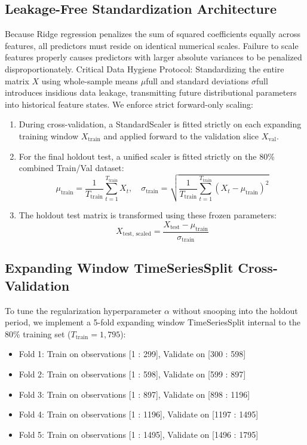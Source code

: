 \documentclass[12pt, a4paper]{article}
\begin{document}
\subsection{Leakage-Free Standardization Architecture}
Because Ridge regression penalizes the sum of squared coefficients equally across features, all predictors 
must reside on identical numerical scales. Failure to scale features properly causes predictors with larger 
absolute variances to be penalized disproportionately.
Critical Data Hygiene Protocol: Standardizing the entire matrix $X$ using whole-sample means 
$\mu$full and standard deviations $\sigma$full introduces insidious data leakage, transmitting future distributional parameters into historical feature states.
We enforce strict forward-only scaling:
\begin{enumerate}
\item During cross-validation, a StandardScaler is fitted strictly on each expanding training window 
$X_{\text{train}}$ and applied forward to the validation slice $X_{\text{val}}$.
\item For the final holdout test, a unified scaler is fitted strictly on the 80\% combined Train/Val 
dataset:
\begin{equation}
\mu_{\text{train}} = \frac{1}{T_{\text{train}}} \sum_{t=1}^{T_{\text{train}}} X_t, \quad \sigma_{\text{train}} = \sqrt{ \frac{1}{T_{\text{train}}} \sum_{t=1}^{T_{\text{train}}} (X_t - \mu_{\text{train}})^2 }
\end{equation}
\item The holdout test matrix is transformed using these frozen parameters:
\begin{equation}
X_{\text{test, scaled}} = \frac{X_{\text{test}} - \mu_{\text{train}}}{\sigma_{\text{train}}}
\end{equation}
\end{enumerate}

\subsection{Expanding Window TimeSeriesSplit Cross-Validation}
To tune the regularization hyperparameter $\alpha$ without snooping into the holdout period, we implement a 
5-fold expanding window TimeSeriesSplit internal to the 80\% training set ($T_{\text{train}} = 1,795$):
\begin{itemize}
\item Fold 1: Train on observations [1 : 299], Validate on [300 : 598]
\item Fold 2: Train on observations [1 : 598], Validate on [599 : 897]
\item Fold 3: Train on observations [1 : 897], Validate on [898 : 1196]
\item Fold 4: Train on observations [1 : 1196], Validate on [1197 : 1495]
\item Fold 5: Train on observations [1 : 1495], Validate on [1496 : 1795]
\end{itemize}
\end{document}
